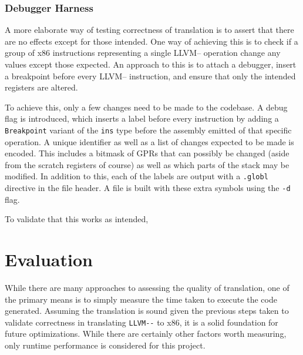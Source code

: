 \documentclass{article}
\begin{document}
\subsubsection{Debugger Harness}
A more elaborate way of testing correctness of translation is to assert that there are no effects except for those intended. One way of achieving this is to check if a group of x86 instructions representing a single LLVM-- operation change any values except those expected. An approach to this is to attach a debugger, insert a breakpoint before every LLVM-- instruction, and ensure that only the intended registers are altered.

To achieve this, only a few changes need to be made to the codebase. A debug flag is introduced, which inserts a label before every instruction by adding a \lstinline!Breakpoint! variant of the \lstinline!ins! type before the assembly emitted of that specific operation. A unique identifier as well as a list of changes expected to be made is encoded. 
This includes a bitmask of GPRs that can possibly be changed (aside from the scratch registers of course) as well as which parts of the stack may be modified. %
In addition to this, each of the labels are output with a \lstinline!.globl! directive in the file header. A file is built with these extra symbols using the \lstinline!-d! flag.

To validate that this works as intended, 





\section{Evaluation}

While there are many approaches to assessing the quality of translation, one of the primary means is to simply measure the time taken to execute the code generated. 
Assuming the translation is sound given the previous steps taken to validate correctness in translating \lstinline!LLVM--! to x86, it is a solid foundation for future optimizations. While there are certainly other factors worth measuring, only runtime performance is considered for this project. %
\end{document}
